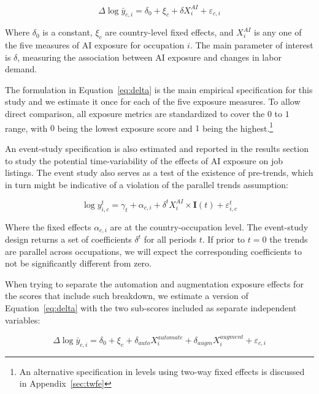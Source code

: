 \documentclass[11pt]{article}
\begin{document}
\begin{equation}
    \Delta\log{\bar{y}}_{c,i} = \delta_0 + \xi_c + \delta X^{AI}_i + \varepsilon_{c,i}
\label{eq:delta}
\end{equation}

Where $\delta_0$ is a constant, $\xi_c$ are country-level fixed effects, and $X^{AI}_i$ is any one of the five measures of AI exposure for occupation $i$. The main parameter of interest is $\delta$, measuring the association between AI exposure and changes in labor demand. 

The formulation in Equation~\ref{eq:delta} is the main empirical specification for this study and we estimate it once for each of the five exposure measures. To allow direct comparison, all exposure metrics are standardized to cover the $0$ to $1$ range, with $0$ being the lowest exposure score and $1$ being the highest.\footnote{An alternative specification in levels using two-way fixed effects is discussed in Appendix~\ref{sec:twfe}}

An event-study specification is also estimated and reported in the results section to study the potential time-variability of the effects of AI exposure on job listings. The event study also serves as a test of the existence of pre-trends, which in turn might be indicative of a violation of the parallel trends assumption:

\begin{equation}
\log{y^t_{i,c}}=\gamma_t + \alpha_{c,i} + \delta^{t} X^{AI}_{i} \times \mathbf{I}(t) + \varepsilon^t_{i,c}
\label{eq:event}
\end{equation}

Where the fixed effects $\alpha_{c,i}$ are at the country-occupation level. The event-study design returns a set of coefficients ${\delta^t}$ for all periods $t$. If prior to $t=0$ the trends are parallel across occupations, we will expect the corresponding coefficients to not be significantly different from zero.

When trying to separate the automation and augmentation exposure effects for the scores that include such breakdown, we estimate a version of Equation~\ref{eq:delta} with the two sub-scores included as separate independent variables:

\begin{equation}
    \Delta\log{\bar{y}}_{c,i} = \delta_0 + \xi_c + \delta_{auto} X^{automate}_i + \delta_{augm} X^{augment}_i + \varepsilon_{c,i}
\label{eq:delta_auto_augm}
\end{equation}
\end{document}
